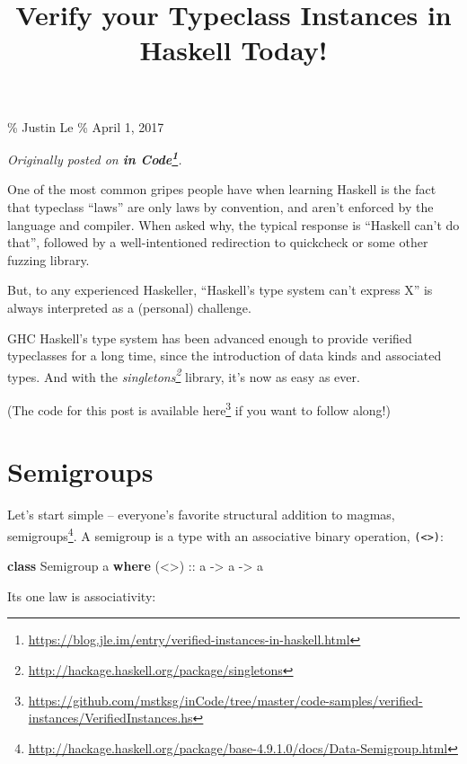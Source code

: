 \documentclass[]{article}
\title{Verify your Typeclass Instances in Haskell Today!}
\newenvironment{Shaded}{}{}
\newcommand{\DataTypeTok}[1]{\textcolor[rgb]{0.56,0.13,0.00}{#1}}
\newcommand{\KeywordTok}[1]{\textcolor[rgb]{0.00,0.44,0.13}{\textbf{#1}}}
\newcommand{\NormalTok}[1]{#1}
\newcommand{\OtherTok}[1]{\textcolor[rgb]{0.00,0.44,0.13}{#1}}
\renewcommand{\href}[2]{#2\footnote{\url{#1}}}
\begin{document}
\maketitle

\% Justin Le \% April 1, 2017

\emph{Originally posted on
\textbf{\href{https://blog.jle.im/entry/verified-instances-in-haskell.html}{in
Code}}.}

One of the most common gripes people have when learning Haskell is the fact that
typeclass ``laws'' are only laws by convention, and aren't enforced by the
language and compiler. When asked why, the typical response is ``Haskell can't
do that'', followed by a well-intentioned redirection to quickcheck or some
other fuzzing library.

But, to any experienced Haskeller, ``Haskell's type system can't express X'' is
always interpreted as a (personal) challenge.

GHC Haskell's type system has been advanced enough to provide verified
typeclasses for a long time, since the introduction of data kinds and associated
types. And with the
\emph{\href{http://hackage.haskell.org/package/singletons}{singletons}} library,
it's now as easy as ever.

(The code for this post is available
\href{https://github.com/mstksg/inCode/tree/master/code-samples/verified-instances/VerifiedInstances.hs}{here}
if you want to follow along!)

\section{Semigroups}\label{semigroups}

Let's start simple -- everyone's favorite structural addition to magmas,
\href{http://hackage.haskell.org/package/base-4.9.1.0/docs/Data-Semigroup.html}{semigroups}.
A semigroup is a type with an associative binary operation,
\texttt{(\textless{}\textgreater{})}:

\begin{Shaded}
\begin{Highlighting}[]
\KeywordTok{class} \DataTypeTok{Semigroup}\NormalTok{ a }\KeywordTok{where}
\OtherTok{    (\textless{}\textgreater{}) ::}\NormalTok{ a }\OtherTok{{-}\textgreater{}}\NormalTok{ a }\OtherTok{{-}\textgreater{}}\NormalTok{ a}
\end{Highlighting}
\end{Shaded}

Its one law is associativity:
\end{document}
